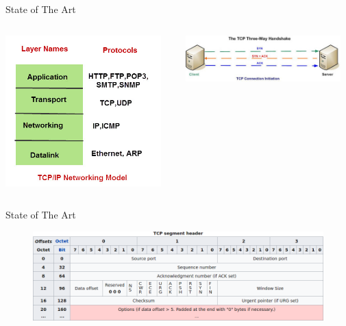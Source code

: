 \documentclass[pdf]{beamer}
\begin{document}
\begin{frame}[fragile]{State of The Art}
\begin{minipage}[0.2\textheight]{\textwidth}
\begin{columns}[T]
\begin{column}{0.5\textwidth}
\includegraphics[width=6cm]{Images/suite.jpg}
\end{column}
\begin{column}{0.5\textwidth}
\vspace{2cm}
\includegraphics[width=6cm]{Images/tcp.jpg}
\end{column}
\end{columns}
\end{minipage}
\end{frame}


\begin{frame}[fragile]{State of The Art}
\begin{figure}
\includegraphics[width=1\linewidth,keepaspectratio]{Images/tcp_head.png}
\end{figure}
\end{frame}
\end{document}
